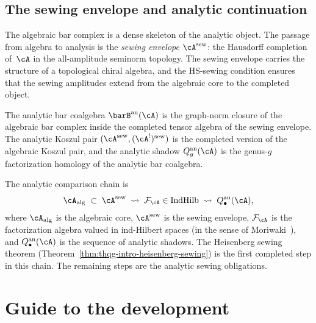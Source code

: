 \subsection{The sewing envelope and analytic continuation}
\label{subsec:thqg-intro-sewing-envelope}

The algebraic bar complex is a dense skeleton of the analytic object.
The passage from algebra to analysis is the \emph{sewing envelope}
$\cA^{\mathrm{sew}}$: the Hausdorff completion of~$\cA$ in the
all-amplitude seminorm topology. The sewing envelope carries
the structure of a topological chiral algebra, and the HS-sewing
condition ensures that the sewing amplitudes extend from the
algebraic core to the completed object.

The analytic bar coalgebra $\barB^{\mathrm{an}}(\cA)$ is the graph-norm
closure of the algebraic bar complex inside the completed tensor
algebra of the sewing envelope. The analytic Koszul pair
$(\cA^{\mathrm{sew}}, (\cA^!)^{\mathrm{sew}})$ is the completed
version of the algebraic Koszul pair, and the analytic shadow
$Q_g^{\mathrm{an}}(\cA)$ is the genus-$g$ factorization homology of
the analytic bar coalgebra.

The analytic comparison chain is
\begin{equation}\label{eq:thqg-intro-analytic-chain}
\cA_{\mathrm{alg}} \;\subset\;
\cA^{\mathrm{sew}} \;\rightsquigarrow\;
\mathcal{F}_\cA \in \mathrm{IndHilb} \;\rightsquigarrow\;
Q_\bullet^{\mathrm{an}}(\cA),
\end{equation}
where $\cA_{\mathrm{alg}}$ is the algebraic core,
$\cA^{\mathrm{sew}}$ is the sewing envelope,
$\mathcal{F}_\cA$ is the factorization algebra valued in ind-Hilbert
spaces (in the sense of Moriwaki~\cite{Moriwaki26a}), and
$Q_\bullet^{\mathrm{an}}(\cA)$ is the sequence of analytic shadows.
The Heisenberg sewing theorem
(Theorem~\ref{thm:thqg-intro-heisenberg-sewing})
is the first completed step in this chain. The remaining steps are
the analytic sewing obligations.



\section{Guide to the development}
\label{sec:thqg-intro-guide}

